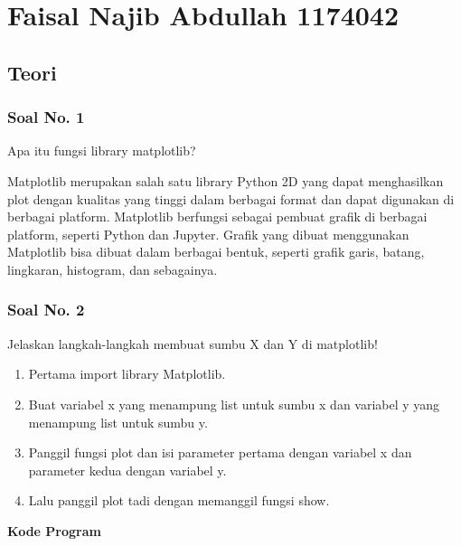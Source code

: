 \section{Faisal Najib Abdullah 1174042}
\subsection{Teori}
\subsubsection{Soal No. 1}
\hfill \break
Apa itu fungsi library matplotlib?

\hfill \break
Matplotlib merupakan salah satu library Python 2D yang dapat menghasilkan plot dengan kualitas yang tinggi dalam berbagai format dan dapat digunakan di berbagai platform. Matplotlib berfungsi sebagai pembuat grafik di berbagai platform, seperti Python dan Jupyter. Grafik yang dibuat menggunakan Matplotlib bisa dibuat dalam berbagai bentuk, seperti grafik garis, batang, lingkaran, histogram, dan sebagainya.

\subsubsection{Soal No. 2}
\hfill \break
Jelaskan langkah-langkah membuat sumbu X dan Y di matplotlib!

\begin{enumerate}
	\item Pertama import library Matplotlib.	
	
	
	\item Buat variabel x yang menampung list untuk sumbu x dan variabel y yang menampung list untuk sumbu y.	
	
	
	\item Panggil fungsi plot dan isi parameter pertama dengan variabel x dan parameter kedua dengan variabel y.
		

	\item Lalu panggil plot tadi dengan memanggil fungsi show.
	
	
\end{enumerate}
\hfill \break
\textbf{Kode Program}




